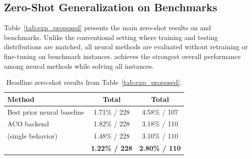 \subsection{Zero-Shot Generalization on Benchmarks}
\label{sec:main-results}

Table~\ref{tab:exp_proposed} presents the main zero-shot results on \TSP{} and \CVRP{} benchmarks. Unlike the conventional setting where training and testing distributions are matched, all neural methods are evaluated without retraining or fine-tuning on benchmark instances. \DyNACS{} achieves the strongest overall performance among neural methods while solving all instances.

\begin{table}[h]
\centering
\caption{Headline zero-shot results from Table~\ref{tab:exp_proposed}.}
\label{tab:headline-results}
\small
\renewcommand{\arraystretch}{0.85}
\begin{tabular*}{\columnwidth}{@{\extracolsep{\fill}}lcc@{}}
\toprule
Method & \TSP{} Total & \CVRP{} Total \\
\midrule
Best prior neural baseline & 1.71\% / 228 & 4.58\% / 107 \\
ACO backend & 1.82\% / 228 & 3.18\% / 110 \\
\DyNACO{} (single behavior) & 1.48\% / 228 & 3.10\% / 110 \\
\DyNACS{} & \textbf{1.22\% / 228} & \textbf{2.80\% / 110} \\
\bottomrule
\end{tabular*}
\end{table}


